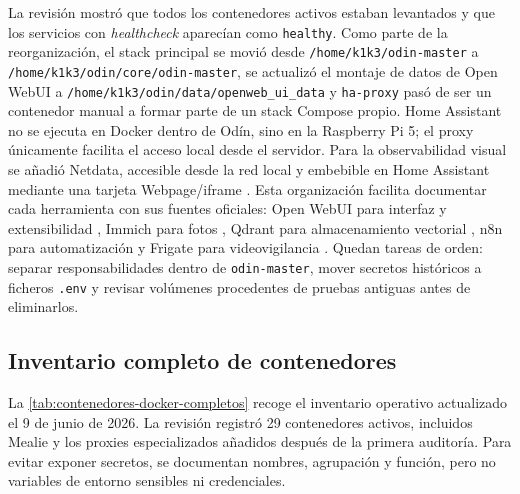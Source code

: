 La revisión mostró que todos los contenedores activos estaban levantados y que los servicios con \textit{healthcheck} aparecían como \texttt{healthy}. Como parte de la reorganización, el stack principal se movió desde \nolinkurl{/home/k1k3/odin-master} a \nolinkurl{/home/k1k3/odin/core/odin-master}, se actualizó el montaje de datos de Open WebUI a \nolinkurl{/home/k1k3/odin/data/openweb_ui_data} y \texttt{ha-proxy} pasó de ser un contenedor manual a formar parte de un stack Compose propio. Home Assistant no se ejecuta en Docker dentro de Odín, sino en la Raspberry Pi 5; el proxy únicamente facilita el acceso local desde el servidor. Para la observabilidad visual se añadió Netdata, accesible desde la red local y embebible en Home Assistant mediante una tarjeta Webpage/iframe \citep{netdataDockerInstall,homeAssistantIframeCard}. Esta organización facilita documentar cada herramienta con sus fuentes oficiales: Open WebUI para interfaz y extensibilidad \citep{openwebuiDocs,openwebuiToolsDocs,openwebuiFunctionsDocs}, Immich para fotos \citep{immichDockerInstall}, Qdrant para almacenamiento vectorial \citep{qdrantDocs,qdrantStorageDocs}, n8n para automatización \citep{n8nDocs,n8nDockerDocs} y Frigate para videovigilancia \citep{frigateInstallDocs}. Quedan tareas de orden: separar responsabilidades dentro de \texttt{odin-master}, mover secretos históricos a ficheros \texttt{.env} y revisar volúmenes procedentes de pruebas antiguas antes de eliminarlos.

\subsection{Inventario completo de contenedores}
La \cref{tab:contenedores-docker-completos} recoge el inventario operativo actualizado el 9 de junio de 2026. La revisión registró 29 contenedores activos, incluidos Mealie y los proxies especializados añadidos después de la primera auditoría. Para evitar exponer secretos, se documentan nombres, agrupación y función, pero no variables de entorno sensibles ni credenciales.

